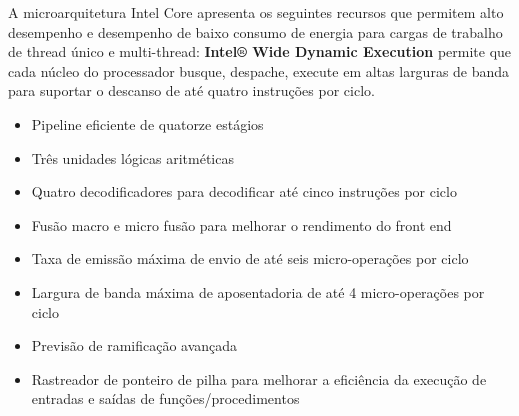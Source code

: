 \documentclass[12pt,a4paper,brazilian,utf8]{ppgsi}
\begin{document}
    A microarquitetura Intel Core apresenta os seguintes recursos que permitem alto desempenho e desempenho de baixo consumo de energia para cargas de trabalho de thread único e multi-thread:
    \textbf{Intel® Wide Dynamic Execution}
    permite que cada núcleo do processador busque, despache, execute em altas larguras de banda para suportar o descanso de até quatro instruções por ciclo.
    \begin{itemize}
        \item Pipeline eficiente de quatorze estágios
        \item Três unidades lógicas aritméticas
        \item Quatro decodificadores para decodificar até cinco instruções por ciclo
        \item Fusão macro e micro fusão para melhorar o rendimento do front end
        \item Taxa de emissão máxima de envio de até seis micro-operações por ciclo
        \item Largura de banda máxima de aposentadoria de até 4 micro-operações por ciclo
        \item Previsão de ramificação avançada
        \item Rastreador de ponteiro de pilha para melhorar a eficiência da execução de entradas e saídas de funções/procedimentos
    \end{itemize}
\end{document}
